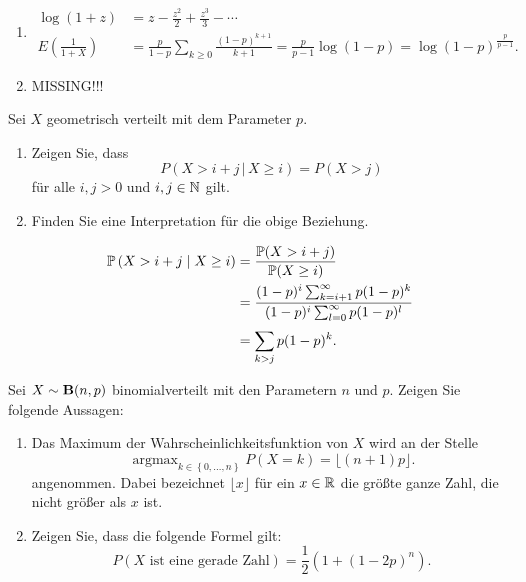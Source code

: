 \solution
\begin{enumerate}
    \item \begin{align*}
            \log (1+z) &= z - \frac{z^2}{2} + \frac{z^3}{3} - \cdots \\
            E \left( \frac{1}{1+X} \right) &= \frac{p}{1-p} \sum_{k\geq 0} \frac{(1-p)^{k+1}}{k+1}
            = \frac{p}{p-1} \log \left( 1-p \right) = \log (1-p)^{\frac{p}{p-1}}. 
        \end{align*}

    \item MISSING!!!
\end{enumerate}

 Sei $X$ geometrisch
verteilt mit dem Parameter $p$.
\begin{enumerate}
    \item Zeigen Sie, dass 
        \begin{equation*}
            P \left( X > i+j \,|\, X \geq i \right) = P\left( X > j \right) 
        \end{equation*}
        für alle $i,j>0$ und $i,j\in\mathbb N$ gilt.

    \item Finden Sie eine Interpretation für die obige Beziehung.
\end{enumerate}

\solution 
\begin{align*}
    \mathbb P\left( X > i+j \;\middle\vert\; X \geq i \right) &= \frac{\mathbb P(X > i+j)}{\mathbb P(X \geq i)} \\
    &= \frac{  (1-p)^{i} \sum_{k=i+1}^{\infty} p(1-p)^{k} }{ (1-p)^{i} \sum_{l=0}^{\infty} p(1-p)^{l} } \\
    &= \sum_{k > j}^{} p(1-p)^k.
\end{align*}

 Sei $X \sim \mathbf B(n,p)$ 
binomialverteilt mit den Parametern $n$ und $p$. Zeigen Sie folgende Aussagen: 
\begin{enumerate}
    \item Das Maximum der Wahrscheinlichkeitsfunktion von $X$ wird an der Stelle
        \begin{equation*}
            \operatorname{argmax}_{k\in \left\{ 0,\dots ,n \right\}} P(X=k) = \lfloor (n+1)p \rfloor.
        \end{equation*}
        angenommen. Dabei bezeichnet $\lfloor x \rfloor$ für ein $x\in\mathbb R$ die
        größte ganze Zahl, die nicht größer als $x$ ist. 

    \item Zeigen Sie, dass die folgende Formel gilt:
        \begin{equation*}
            P\left( X \text{ ist eine gerade Zahl} \right) = \frac{1}{2}\left( 1 + (1-2p)^n \right). 
        \end{equation*}
\end{enumerate}

